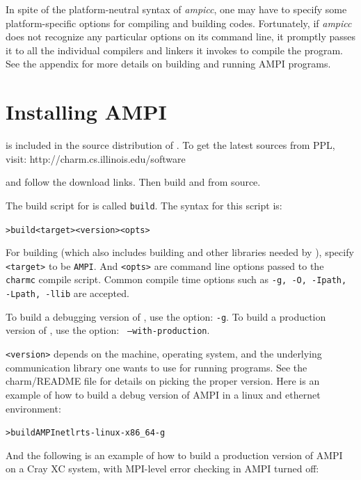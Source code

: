 \documentclass[10pt]{article}
\begin{document}
In spite of the platform-neutral syntax of \emph{ampicc}, one may have to specify
some platform-specific options for compiling and building \ampi{} codes.
Fortunately, if \emph{ampicc} does not recognize any particular options on its
command line, it promptly passes it to all the individual compilers and linkers
it invokes to compile the program. See the appendix for more details on
building and running AMPI programs.

\appendix

\section{Installing AMPI}

\ampi{} is included in the source distribution of \charmpp{}.
To get the latest sources from PPL, visit:
	http://charm.cs.illinois.edu/software

and follow the download links.
Then build \charmpp{} and \ampi{} from source.

The build script for \charmpp{} is called \texttt{build}. The syntax for this
script is:

\begin{alltt}
> build <target> <version> <opts>
\end{alltt}

For building \ampi{} (which also includes building \charmpp{} and other
libraries needed by \ampi{}), specify \verb+<target>+ to be \verb+AMPI+. And
\verb+<opts>+ are command line options passed to the \verb+charmc+ compile
script.  Common compile time options such as \texttt{-g, -O, -Ipath, -Lpath,
-llib} are accepted.

To build a debugging version of \ampi{}, use the option: \texttt{-g}.
To build a production version of \ampi{}, use the option: \texttt{
--with-production}.

\verb+<version>+ depends on the machine, operating system, and the underlying
communication library one wants to use for running \ampi{} programs.
See the charm/README file for details on picking the proper version.
Here is an example of how to build a debug version of AMPI in a
linux and ethernet environment:

\begin{alltt}
> build AMPI netlrts-linux-x86_64 -g
\end{alltt}

And the following is an example of how to build a production version of AMPI on a
Cray XC system, with MPI-level error checking in AMPI turned off:
\end{document}
